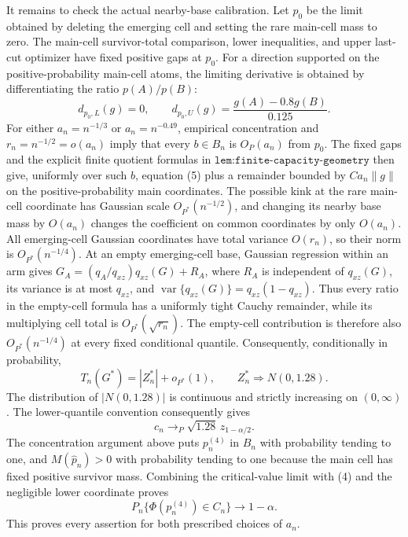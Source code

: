 It remains to check the actual nearby-base calibration.  Let \(p_0\) be the limit obtained by deleting the emerging cell and setting the rare main-cell mass to zero.  The main-cell survivor-total comparison, lower inequalities, and upper last-cut optimizer have fixed positive gaps at \(p_0\).  For a direction supported on the positive-probability main-cell atoms, the limiting derivative is obtained by differentiating the ratio \(p(A)/p(B)\):
\[
d_{p_0,L}(g)=0,
\qquad
d_{p_0,U}(g)=\frac{g(A)-0.8g(B)}{0.125}.
\tag{5}
\]
For either \(a_n=n^{-1/3}\) or \(a_n=n^{-0.49}\), empirical concentration and \(r_n=n^{-1/2}=o(a_n)\) imply that every \(b\in B_n\) is \(O_P(a_n)\) from \(p_0\).  The fixed gaps and the explicit finite quotient formulas in \(\texttt{lem:finite-capacity-geometry}\) then give, uniformly over such \(b\), equation (5) plus a remainder bounded by \(C a_n\|g\|\) on the positive-probability main coordinates.  The possible kink at the rare main-cell coordinate has Gaussian scale \(O_{P^*}(n^{-1/2})\), and changing its nearby base mass by \(O(a_n)\) changes the coefficient on common coordinates by only \(O(a_n)\).  All emerging-cell Gaussian coordinates have total variance \(O(r_n)\), so their norm is \(O_{P^*}(n^{-1/4})\).  At an empty emerging-cell base, Gaussian regression within an arm gives \(G_A=(q_A/q_{xz})q_{xz}(G)+R_A\), where \(R_A\) is independent of \(q_{xz}(G)\), its variance is at most \(q_{xz}\), and \(\operatorname{var}\{q_{xz}(G)\}=q_{xz}(1-q_{xz})\).  Thus every ratio in the empty-cell formula has a uniformly tight Cauchy remainder, while its multiplying cell total is \(O_{P^*}(\sqrt{r_n})\).  The empty-cell contribution is therefore also \(O_{P^*}(n^{-1/4})\) at every fixed conditional quantile.  Consequently, conditionally in probability,
\[
T_n(G^*)=|Z_n^*|+o_{P^*}(1),
\qquad
Z_n^*\Rightarrow N(0,1.28).
\]
The distribution of \(|N(0,1.28)|\) is continuous and strictly increasing on \((0,\infty)\).  The lower-quantile convention consequently gives
\[
c_n\to_P\sqrt{1.28}\,z_{1-\alpha/2}.
\]
The concentration argument above puts \(p_n^{(4)}\) in \(B_n\) with probability tending to one, and \(M(\widehat p_n)>0\) with probability tending to one because the main cell has fixed positive survivor mass.  Combining the critical-value limit with (4) and the negligible lower coordinate proves
\[
P_n\{\Phi(p_n^{(4)})\in C_n\}\longrightarrow1-\alpha.
\]
This proves every assertion for both prescribed choices of \(a_n\).
